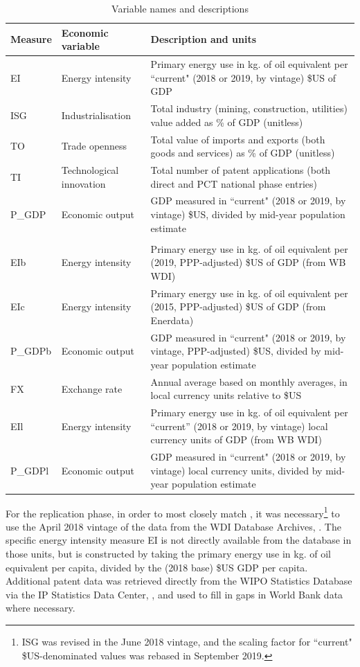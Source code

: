 \documentclass[11pt,a4paper]{article}
\begin{document}
\begin{table}[htbp]
\centering
\begin{tabulary}{\textwidth}{l l L} 
 \toprule 
 Measure & Economic variable & Description and units \\ [1ex] 
 \midrule 
 EI & Energy intensity & Primary energy use in kg. of oil equivalent per ``current" (2018 or 2019, by vintage) \$US of GDP \\ 
 ISG & Industrialisation & Total industry (mining, construction, utilities) value added as \% of GDP (unitless) \\
 TO & Trade openness & Total value of imports and exports (both goods and services) as \% of GDP (unitless) \\ 
 TI & Technological innovation & Total number of patent applications (both direct and PCT national phase entries) \\ 
 P\_GDP & Economic output & GDP measured in ``current" (2018 or 2019, by vintage) \$US, divided by mid-year population estimate\\
\hline \\ 
   EIb & Energy intensity & Primary energy use in kg. of oil equivalent per (2019, PPP-adjusted) \$US of GDP (from WB WDI) \\ 
 EIc & Energy intensity & Primary energy use in kg. of oil equivalent per (2015, PPP-adjusted) \$US of GDP (from Enerdata) \\ 
 P\_GDPb & Economic output & GDP measured in ``current" (2018 or 2019, by vintage, PPP-adjusted) \$US, divided by mid-year population estimate\\ 
 FX & Exchange rate &  Annual average based on monthly averages, in local currency units relative to \$US\\ 
   EIl & Energy intensity & Primary energy use in kg. of oil equivalent per ``current'' (2018 or 2019, by vintage) local currency units of GDP (from WB WDI) \\ 
 P\_GDPl & Economic output & GDP measured in ``current" (2018 or 2019, by vintage) local currency units, divided by mid-year population estimate\\ 
 \bottomrule 
\end{tabulary}
\caption{Variable names and descriptions}
\label{tab:data_source}
\end{table}

For the replication phase, in order to most closely match \cite{panHowIndustrializationTrade2019}, it was necessary\footnote{
ISG was revised in the June 2018 vintage, and the scaling factor for ``current" \$US-denominated values was rebased in September 2019.
} to use the April 2018 vintage of the data from the WDI Database Archives, \cite{theworldbankWDIDatabaseArchives2018}.
The specific energy intensity measure EI is not directly available from the database in those units, but is constructed by taking the primary energy use in kg. of oil equivalent per capita, divided by the (2018 base) \$US GDP per capita.
Additional patent data was retrieved directly from the WIPO Statistics Database via the IP Statistics Data Center, \cite{wipoWIPOStatisticsDatabase2020}, and used to fill in gaps in World Bank data where necessary.
\end{document}
